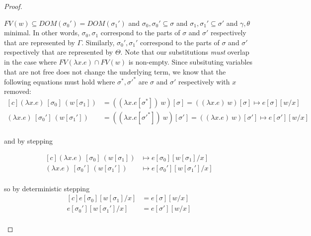 \begin{proof}
\begin{description}
      $FV(w) \subseteq DOM(\sigma_0') = DOM(\sigma_1')$ and 
      $\sigma_0, \sigma_0' \subseteq \sigma$ and 
      $\sigma_1, \sigma_1' \subseteq \sigma'$ and $\gamma, \theta$ minimal.
      In other words, $\sigma_0, \sigma_1$ correspond to the parts of $\sigma$ and $\sigma'$ 
      respectively that are represented by $\Gamma$.
      Similarly, $\sigma_0', \sigma_1'$ correspond to the parts of $\sigma$ and $\sigma'$ 
      respectively that are represented by $\Theta$.
      Note that our substitutions \textit{must} overlap in the case where $FV(\lambda x . e)
      \cap FV(w)$ is non-empty.
      Since subsituting variables that are not free does not change the
      underlying term, we know that the following equations must hold where
      $\sigma^*, \sigma'^*$ are $\sigma$ and $\sigma'$ respectively with $x$
      removed:
      \begin{equation}
        \begin{aligned}[c]
          (\lambda x . e)~[\sigma_0]~(w[\sigma_1]) &= 
            ((\lambda x . e[\sigma^*])~w)[\sigma] = 
            ((\lambda x . e)~w)[\sigma] \mapsto
            e[\sigma][w/x] \\
          (\lambda x . e)~[\sigma_0']~(w[\sigma_1']) &= 
            ((\lambda x . e[\sigma'^*])~w)[\sigma'] = 
            ((\lambda x . e)~w)[\sigma'] \mapsto
            e[\sigma'][w/x] \\
        \end{aligned}
      \end{equation}

      and by stepping

      \begin{equation}
        \begin{aligned}[c]
          (\lambda x . e)~[\sigma_0]~(w[\sigma_1]) &\mapsto e[\sigma_0][w[\sigma_1]/x] \\
          (\lambda x . e)~[\sigma_0']~(w[\sigma_1']) &\mapsto e[\sigma_0'][w[\sigma_1']/x] \\
        \end{aligned}
      \end{equation}

      so by deterministic stepping
      \begin{equation}
        \begin{aligned}[c]
          e[\sigma_0][w[\sigma_1]/x] &=
            e[\sigma][w/x] \\
          e[\sigma_0'][w[\sigma_1']/x] &=
            e[\sigma'][w/x] \\
        \end{aligned}
      \end{equation}


\end{description}
\end{proof}
